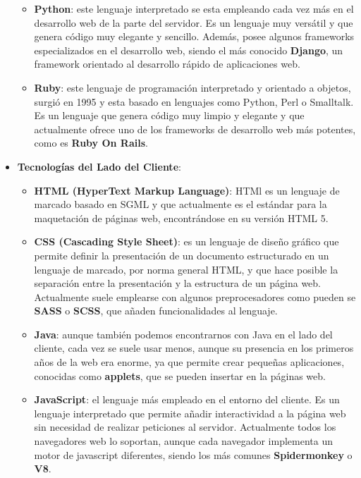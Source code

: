 \begin{itemize}
\begin{itemize}
        \item \textbf{Python}: este lenguaje interpretado se esta empleando cada vez más en el desarrollo web de la parte del servidor. Es un lenguaje muy versátil y que genera código muy elegante y sencillo. Además, posee algunos frameworks especializados en el desarrollo web, siendo el más conocido \textbf{Django}, un framework orientado al desarrollo rápido de aplicaciones web.

        \item \textbf{Ruby}: este lenguaje de programación interpretado y orientado a objetos, surgió en 1995 y esta basado en lenguajes como Python, Perl o Smalltalk. Es un lenguaje que genera código muy limpio y elegante y que actualmente ofrece uno de los frameworks de desarrollo web más potentes, como es \textbf{Ruby On Rails}.
    \end{itemize}

    \item \textbf{Tecnologías del Lado del Cliente}:
    \begin{itemize}
        \item \textbf{HTML (HyperText Markup Language)}: HTMl es un lenguaje de marcado  basado en SGML y que actualmente es el estándar para la maquetación de páginas web, encontrándose en su versión HTML 5.

        \item \textbf{CSS (Cascading Style Sheet)}: es un lenguaje de diseño gráfico que permite definir la presentación de un documento estructurado en un lenguaje de marcado, por norma general HTML, y que hace posible la separación entre la presentación y la estructura de un página web. Actualmente suele emplearse con algunos preprocesadores como pueden se \textbf{SASS} o \textbf{SCSS}, que añaden funcionalidades al lenguaje.

        \item \textbf{Java}: aunque también podemos encontrarnos con Java en el lado del cliente, cada vez se suele usar menos, aunque su presencia en los primeros años de la web era enorme, ya que permite crear pequeñas aplicaciones, conocidas como \textbf{applets}, que se pueden insertar en la páginas web.

        \item \textbf{JavaScript}: el lenguaje más empleado en el entorno del cliente. Es un lenguaje interpretado que permite añadir interactividad a la página web sin necesidad de realizar peticiones al servidor. Actualmente todos los navegadores web lo soportan, aunque cada navegador implementa un motor de javascript diferentes, siendo los más comunes \textbf{Spidermonkey} o \textbf{V8}.


\end{itemize}
\end{itemize}
